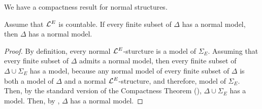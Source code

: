 We have a compactness result for normal structures.

\begin{boxtheorem}
    Assume that $\mathcal{L}^{E}$ is countable. If every finite subset of $\Delta$ has a normal model, then $\Delta$ has a normal model.
\end{boxtheorem}
\begin{proof}
    By definition, every normal $\mathcal{L}^{E}$-sturcture is a model of $\Sigma_E$. Assuming that every finite subset of $\Delta$ admits a normal model, then every finite subset of $\Delta \cup \Sigma_{E}$ has a model, because any normal model of every finite subset of $\Delta$ is both a model of $\Delta$ and a normal $\mathcal{L}^{E}$-structure, and therefore, model of $\Sigma_E$. Then, by the standard version of the Compactness Theorem (), $\Delta \cup \Sigma_E$ has a model. Then, by , $\Delta$ has a normal model.
\end{proof}
